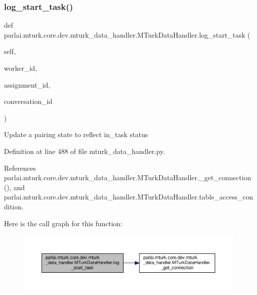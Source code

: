\subsubsection{\texorpdfstring{log\+\_\+start\+\_\+task()}{log\_start\_task()}}
{\footnotesize\ttfamily def parlai.\+mturk.\+core.\+dev.\+mturk\+\_\+data\+\_\+handler.\+M\+Turk\+Data\+Handler.\+log\+\_\+start\+\_\+task (\begin{DoxyParamCaption}\item[{}]{self,  }\item[{}]{worker\+\_\+id,  }\item[{}]{assignment\+\_\+id,  }\item[{}]{conversation\+\_\+id }\end{DoxyParamCaption})}

\begin{DoxyVerb}Update a pairing state to reflect in_task status\end{DoxyVerb}
 

Definition at line 488 of file mturk\+\_\+data\+\_\+handler.\+py.



References parlai.\+mturk.\+core.\+dev.\+mturk\+\_\+data\+\_\+handler.\+M\+Turk\+Data\+Handler.\+\_\+get\+\_\+connection(), and parlai.\+mturk.\+core.\+dev.\+mturk\+\_\+data\+\_\+handler.\+M\+Turk\+Data\+Handler.\+table\+\_\+access\+\_\+condition.

Here is the call graph for this function\+:
\nopagebreak
\begin{figure}[H]
\begin{center}
\leavevmode
\includegraphics[width=350pt]{classparlai_1_1mturk_1_1core_1_1dev_1_1mturk__data__handler_1_1MTurkDataHandler_ac8a4ba8bd6942424ff47149189c027a3_cgraph}
\end{center}
\end{figure}
\mbox{\label{classparlai_1_1mturk_1_1core_1_1dev_1_1mturk__data__handler_1_1MTurkDataHandler_a5a9a1246250044f6f13117c899285c82}} 
